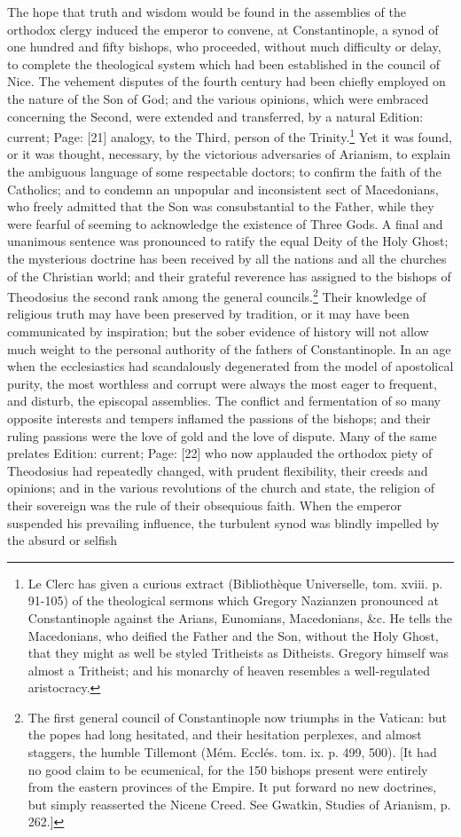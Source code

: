 The hope that truth and wisdom would be found in the assemblies of the orthodox clergy induced the emperor to convene, at Constantinople, a synod of one hundred and fifty bishops, who proceeded, without much difficulty or delay, to complete the theological system which had been established in the council of Nice. The vehement disputes of the fourth century had been chiefly employed on the nature of the Son of God; and the various opinions, which were embraced concerning the Second, were extended and transferred, by a natural Edition: current; Page: [21] analogy, to the Third, person of the Trinity.\footnote{Le Clerc has given a curious extract (Bibliothèque Universelle, tom. xviii. p. 91-105) of the theological sermons which Gregory Nazianzen pronounced at Constantinople against the Arians, Eunomians, Macedonians, \&c. He tells the Macedonians, who deified the Father and the Son, without the Holy Ghost, that they might as well be styled Tritheists as Ditheists. Gregory himself was almost a Tritheist; and his monarchy of heaven resembles a well-regulated aristocracy.} Yet it was found, or it was thought, necessary, by the victorious adversaries of Arianism, to explain the ambiguous language of some respectable doctors; to confirm the faith of the Catholics; and to condemn an unpopular and inconsistent sect of Macedonians, who freely admitted that the Son was consubstantial to the Father, while they were fearful of seeming to acknowledge the existence of Three Gods. A final and unanimous sentence was pronounced to ratify the equal Deity of the Holy Ghost; the mysterious doctrine has been received by all the nations and all the churches of the Christian world; and their grateful reverence has assigned to the bishops of Theodosius the second rank among the general councils.\footnote{The first general council of Constantinople now triumphs in the Vatican: but the popes had long hesitated, and their hesitation perplexes, and almost staggers, the humble Tillemont (Mém. Ecclés. tom. ix. p. 499, 500). [It had no good claim to be ecumenical, for the 150 bishops present were entirely from the eastern provinces of the Empire. It put forward no new doctrines, but simply reasserted the Nicene Creed. See Gwatkin, Studies of Arianism, p. 262.]} Their knowledge of religious truth may have been preserved by tradition, or it may have been communicated by inspiration; but the sober evidence of history will not allow much weight to the personal authority of the fathers of Constantinople. In an age when the ecclesiastics had scandalously degenerated from the model of apostolical purity, the most worthless and corrupt were always the most eager to frequent, and disturb, the episcopal assemblies. The conflict and fermentation of so many opposite interests and tempers inflamed the passions of the bishops; and their ruling passions were the love of gold and the love of dispute. Many of the same prelates Edition: current; Page: [22] who now applauded the orthodox piety of Theodosius had repeatedly changed, with prudent flexibility, their creeds and opinions; and in the various revolutions of the church and state, the religion of their sovereign was the rule of their obsequious faith. When the emperor suspended his prevailing influence, the turbulent synod was blindly impelled by the absurd or selfish 